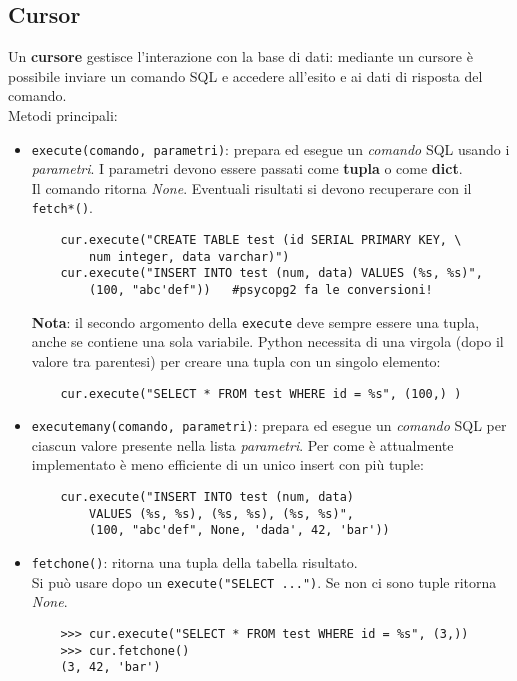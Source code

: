 \documentclass[a4paper, 10pt, titlepage]{article}
\begin{document}
	\subsection{Cursor}
	Un \textbf{cursore} gestisce l'interazione con la base di dati: mediante un cursore è possibile inviare un comando SQL e accedere all'esito e ai dati di risposta del comando.\\
	Metodi principali:
	\begin{itemize}
	\item \lstinline[keywordstyle=\color{black}]|execute(comando, parametri)|: prepara ed esegue un \textit{comando} SQL usando i \textit{parametri}. I parametri devono essere passati come \textbf{tupla} o come \textbf{dict}.\\
	Il comando ritorna \textit{None}. Eventuali risultati si devono recuperare con il \lstinline|fetch*()|.
	\begin{lstlisting}
	cur.execute("CREATE TABLE test (id SERIAL PRIMARY KEY, \ 
		num integer, data varchar)")
	cur.execute("INSERT INTO test (num, data) VALUES (%s, %s)",
		(100, "abc'def"))	#psycopg2 fa le conversioni!
	\end{lstlisting}
	\textbf{Nota}: il secondo argomento della \lstinline|execute| deve sempre essere una tupla, anche se contiene una sola variabile. Python necessita di una virgola (dopo il valore tra parentesi) per creare una tupla con un singolo elemento:
	\begin{lstlisting}
	cur.execute("SELECT * FROM test WHERE id = %s", (100,) )
	\end{lstlisting}
	\item \lstinline|executemany(comando, parametri)|: prepara ed esegue un \textit{comando} SQL per ciascun valore presente nella lista \textit{parametri}. Per come è attualmente implementato è meno efficiente di un unico insert con più tuple:
	\begin{lstlisting}
	cur.execute("INSERT INTO test (num, data) 
		VALUES (%s, %s), (%s, %s), (%s, %s)", 
		(100, "abc'def", None, 'dada', 42, 'bar'))
	\end{lstlisting}
	\item \lstinline|fetchone()|: ritorna una tupla della tabella risultato.\\ Si può usare dopo un \lstinline|execute("SELECT ...")|. Se non ci sono tuple ritorna \textit{None}.
	\begin{lstlisting}
	>>> cur.execute("SELECT * FROM test WHERE id = %s", (3,))
	>>> cur.fetchone()
	(3, 42, 'bar')
	\end{lstlisting}

\end{itemize}
\end{document}
